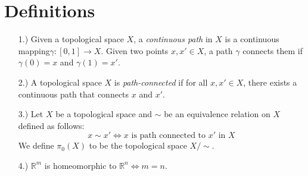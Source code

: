 \documentclass[12pt]{article}
\newcommand{\R}{\mathbb{R}}
\begin{document}
\pagestyle{fancy}
\fancyhead{}

\normalsize

\section*{Definitions}
\begin{itemize}
    \item [1.)] Given a topological space $X$, a \textit{continuous path} in $X$ is a continuous mapping\break$\gamma:[0,1]\to X$. Given two points $x,x'\in X$, a path $\gamma$ connects them if $\gamma(0)=x$ and $\gamma(1)=x'$.

    \item [2.)] A topological space $X$ is \textit{path-connected} if for all $x,x'\in X$, there exists a continuous path that connects $x$ and $x'$.

    \item [3.)] Let $X$ be a topological space and $\sim$ be an equivalence relation on $X$ defined as follows:
    \[x\sim x'\iff x\text{ is path connected to }x'\text{ in }X\]
    We define $\pi_0(X)$ to be the topological space $X/{\sim}$.

    \item [4.)] $\R^m$ is homeomorphic to $\R^n\iff m=n$.
\end{itemize}
\end{document}

